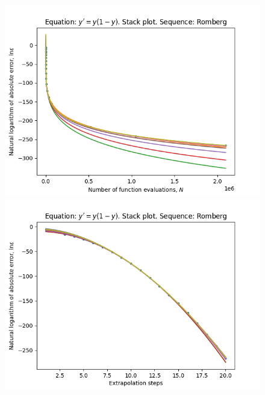 \begin{figure}[H]
\centering
\begin{minipage}{0.45\textwidth}
\centering
\includegraphics[scale=0.45]{../results/emr_plots/logistic_hp_romberg_stack.png}
\end{minipage}
\begin{minipage}{0.45\textwidth}
\centering
\includegraphics[scale=0.45]{../results/emr_plots/logistic_hp_romberg_steps_stack.png}
\end{minipage}
\end{figure}

